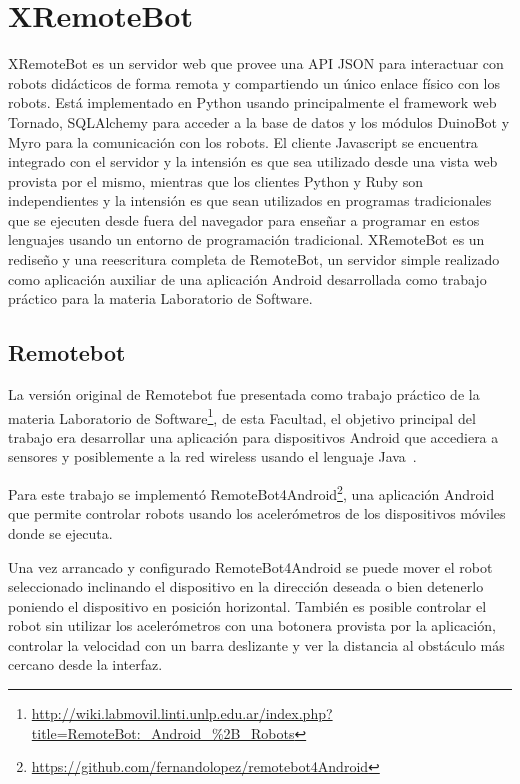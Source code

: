 \chapter{XRemoteBot}\label{cha:xremotebot}




XRemoteBot es un servidor web que provee una API JSON para interactuar
con robots didácticos de forma remota y compartiendo un único enlace
físico con los robots. Está implementado en Python usando principalmente el
framework web Tornado, SQLAlchemy para acceder a la base de datos
y los módulos DuinoBot y Myro para
la comunicación con los robots. El cliente Javascript se encuentra
integrado con el servidor y la intensión es que sea utilizado desde una
vista web provista por el mismo, mientras que los clientes Python y Ruby
son independientes y la intensión es que sean utilizados en programas
tradicionales que se ejecuten desde fuera del navegador para enseñar
a programar en estos lenguajes usando un entorno de programación
tradicional. XRemoteBot
es un rediseño y una reescritura completa de RemoteBot, un servidor
simple realizado como aplicación auxiliar de una aplicación Android
desarrollada
como trabajo práctico para la materia Laboratorio de Software.

\section{Remotebot}\label{sec:remotebot}

La versión original de Remotebot fue presentada como trabajo práctico
de la materia Laboratorio de
Software\footnote{\url{http://wiki.labmovil.linti.unlp.edu.ar/index.php?title=RemoteBot:_Android_\%2B_Robots}},
de esta Facultad,
el objetivo principal del trabajo era desarrollar una aplicación para
dispositivos Android que accediera a sensores y posiblemente a la red
wireless usando el lenguaje Java~\citep{queiruga_2013}.

Para este trabajo se implementó
RemoteBot4Android\footnote{\url{https://github.com/fernandolopez/remotebot4Android}},
una aplicación Android
que permite controlar robots usando los acelerómetros de los dispositivos
móviles donde se ejecuta.

Una vez arrancado y configurado RemoteBot4Android se puede mover el robot
seleccionado inclinando el dispositivo en la dirección deseada o bien
detenerlo poniendo el dispositivo en posición horizontal. También es
posible controlar el robot sin utilizar los acelerómetros
con una botonera provista por la aplicación,
controlar la velocidad con un barra deslizante y ver la distancia al obstáculo
más cercano desde la interfaz.

